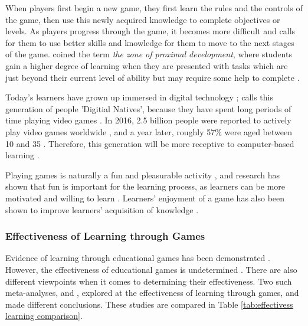 \documentclass[a4paper,11.5pt]{report}
\numberwithin{figure}{section}
\numberwithin{table}{section}
\numberwithin{equation}{section}
\numberwithin{equation}{section}
\begin{document}
When players first begin a new game, they first learn the rules and the controls of the game, then use this newly acquired knowledge to complete objectives or levels. As players progress through the game, it becomes more difficult and calls for them to use better skills and knowledge for them to move to the next stages of the game. \citeauthor{vygotsky1978} coined the term \textit{the zone of proximal development}, where students gain a higher degree of learning when they are presented with tasks which are just beyond their current level of ability but may require some help to complete \citep{vygotsky1978}.

Today's learners have grown up immersed in digital technology \citep{Prensky2001}; \citeauthor{Prensky2001} calls this generation of people 'Digitial Natives', because they have spent long periods of time playing video games \citep{prensky2003}. In 2016, 2.5 billion people were reported to actively play video games worldwide \citep{Statista}, and a year later, roughly 57\% were aged between 10 and 35 \citep{Statistanewzoo}. Therefore, this generation will be more receptive to computer-based learning \citep{Girard2013}.

Playing games is naturally a fun and pleasurable activity \citep{Prensky2001}, and research has shown that fun is important for the learning process, as learners can be more motivated and willing to learn \citep{Bisson1996, Cordova1996}. Learners' enjoyment of a game has also been shown to improve learners' acquisition of knowledge \citep{giannakos2013}.



\subsubsection{Effectiveness of Learning through Games} %

Evidence of learning through educational games has been demonstrated \citep{Connolly2012, Pieter2013, Girard2013}. However, the effectiveness of educational games is undetermined \citep{Connolly2012, Girard2013}. There are also different viewpoints when it comes to determining their effectiveness. Two such meta-analyses, \citet{Pieter2013} and \citet{Girard2013}, explored at the effectiveness of learning through games, and made different conclusions. These studies are compared in Table \ref{tab:effectivess learning comparison}.
\end{document}
